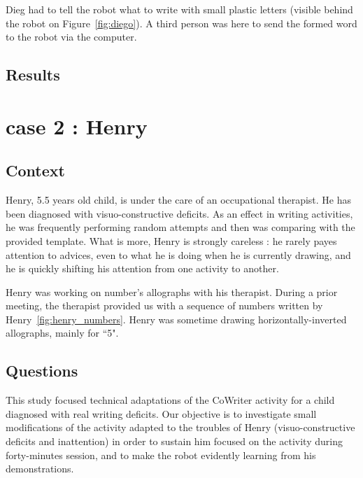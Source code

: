 \documentclass{sig-alternate}
\begin{document}
Dieg had to tell the robot what to write with small plastic letters (visible
behind the robot on Figure~\ref{fig:diego}). A third person was here to send
the formed word to the robot via the computer.



\subsection{Results}

\section{case 2 : Henry}

\subsection{Context}

Henry, 5.5 years old child, is under the care of an occupational
therapist. He has been diagnosed with visuo-constructive deficits.
As an effect in writing activities, he was frequently performing random attempts and then was comparing
with the provided template. What is more, Henry is strongly careless : he
rarely payes attention to
advices, even to what he is doing when he is currently drawing, and he is
quickly shifting his attention from one activity to another.

Henry was working on number's allographs with his therapist. During a prior
meeting, the therapist provided us with a sequence of numbers
written by Henry~\ref{fig:henry_numbers}. Henry was sometime drawing
horizontally-inverted allographs, mainly for ``5".

\subsection{Questions}
This study focused technical adaptations of the CoWriter activity for a 
child diagnosed with real writing deficits.
Our objective is to investigate small modifications of the activity adapted to
the troubles of Henry (visuo-constructive deficits and inattention) in order to
sustain him focused
on the activity during forty-minutes session, and to make the robot
evidently learning from his demonstrations.
\end{document}
